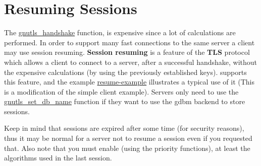 \section{Resuming Sessions}
\par
The 
\hyperref{gnutls\_handshake()}{gnutls\_handshake() (see Section }{ for more information)}{gnutls_handshake}
 function, is expensive since a lot of calculations are performed. In order to support many fast connections to
the same server a client may use session resuming. {\bf Session resuming} is a
feature of the {\bf TLS} protocol which allows a client to connect to a server,
after a successful handshake, without the expensive calculations (by using the previously
established keys). \gnutls supports this feature, and the
example \hyperref{resume client}{resume client (see Section }{ for more
information)}{resume-example} illustrates a typical use of it (This is a modification of the simple client example).
Servers only need to use the
\hyperref{gnutls\_set\_db\_name()}{gnutls\_set\_db\_name() (see Section }{ for more
information)}{gnutls_set_db_name} function if they want to use the gdbm
backend to store sessions. 
\par
Keep in mind that sessions are expired after some time (for security reasons), thus
it may be normal for a server not to resume a session even if you requested that.
Also note that you must enable (using the priority functions), at least the
algorithms used in the last session.

